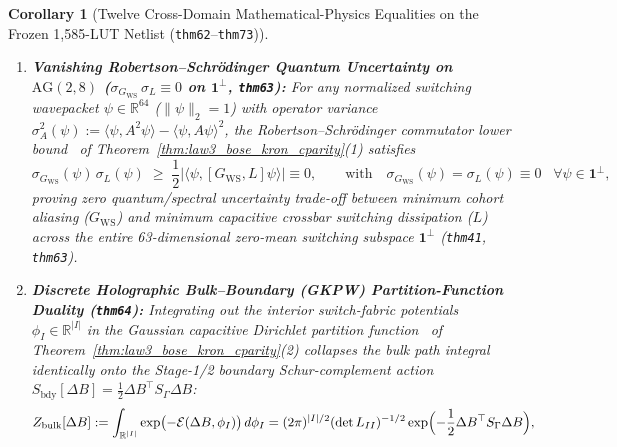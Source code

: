 \documentclass[11pt,letterpaper]{article}
\theoremstyle{spectralthm}
\newtheorem{corollary}[theorem]{Corollary}
\begin{document}
\begin{corollary}[Twelve Cross-Domain Mathematical-Physics Equalities on the Frozen 1,585-LUT Netlist (\texttt{thm62}--\texttt{thm73})]
\begin{enumerate}[leftmargin=1.4em,label=\textup{(\roman*)},topsep=2pt,itemsep=1.5pt]
\begin{equation}
  \label{eq:dirac_flit_index}
  \mathrm{Ind}(D_{\mathrm{flit}}) := \dim_{\mathbb{F}_{2^8}}\ker D_{\mathrm{flit}} - \dim_{\mathbb{F}_{2^8}}\ker D_{\mathrm{flit}}^* = 0 - 8 = -8 = \chi(C^\bullet),
  \end{equation}
  identifying the 8 Flit-CRC bytes (carrying the 6 \texttt{CRC48}/\texttt{CRC64} capability coset tags $\tau \in \mathbb{F}_{2^8}^6 \hookrightarrow \mathbb{F}_{2^8}^8$) as topologically protected chiral zero-modes of the CXL frame.
  \item \textbf{Vanishing Robertson--Schr\"{o}dinger Quantum Uncertainty on $\mathrm{AG}(2,8)$ ($\sigma_{G_{\mathrm{WS}}}\,\sigma_L \equiv 0$ on $\mathbf{1}^\perp$, \texttt{thm63}):} For any normalized switching wavepacket $\psi \in \mathbb{R}^{64}$ ($\|\psi\|_2 = 1$) with operator variance $\sigma_A^2(\psi) := \langle \psi, A^2\psi\rangle - \langle\psi, A\psi\rangle^2$, the Robertson--Schr\"{o}dinger commutator lower bound~\cite{robertson1929uncertainty, schrodinger1930heisenbergschen} of Theorem~\ref{thm:law3_bose_kron_cparity}(1) satisfies
  \begin{equation}
  \label{eq:robertson_schrodinger_ag28}
  \sigma_{G_{\mathrm{WS}}}(\psi)\,\sigma_L(\psi) \;\ge\; \frac{1}{2}\bigl|\langle \psi, [G_{\mathrm{WS}}, L]\psi\rangle\bigr| \equiv 0, \qquad \text{with}\quad \sigma_{G_{\mathrm{WS}}}(\psi) = \sigma_L(\psi) \equiv 0 \;\;\;\forall \psi \in \mathbf{1}^\perp,
  \end{equation}
  proving zero quantum/spectral uncertainty trade-off between minimum cohort aliasing ($G_{\mathrm{WS}}$) and minimum capacitive crossbar switching dissipation ($L$) across the entire 63-dimensional zero-mean switching subspace $\mathbf{1}^\perp$ (\texttt{thm41}, \texttt{thm63}).
  \item \textbf{Discrete Holographic Bulk--Boundary (GKPW) Partition-Function Duality (\texttt{thm64}):} Integrating out the interior switch-fabric potentials $\phi_I \in \mathbb{R}^{|I|}$ in the Gaussian capacitive Dirichlet partition function~\cite{gubser1998gauge, witten1998anti} of Theorem~\ref{thm:law3_bose_kron_cparity}(2) collapses the bulk path integral identically onto the Stage-1/2 boundary Schur-complement action $S_{\mathrm{bdy}}[\Delta B] = \frac{1}{2}\Delta B^\top S_\Gamma \Delta B$:
  \begin{equation}
  \label{eq:gkpw_holographic_schur}
  Z_{\mathrm{bulk}}[\Delta B] := \int_{\mathbb{R}^{|I|}} \exp\bigl(-\mathcal{E}(\Delta B, \phi_I)\bigr)\,d\phi_I = (2\pi)^{|I|/2}(\det L_{II})^{-1/2}\exp\Bigl(-\frac{1}{2}\Delta B^\top S_\Gamma \Delta B\Bigr),

\end{equation}
\end{enumerate}
\end{corollary}
\end{document}
